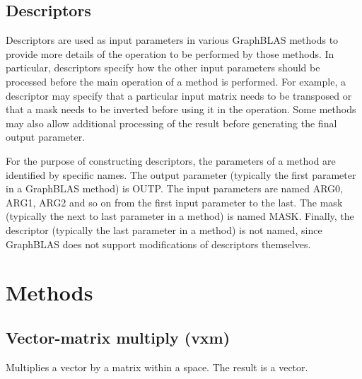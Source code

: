 \documentclass[11pt]{extarticle}
\begin{document}
\subsection{Descriptors}

Descriptors are used as input parameters in various GraphBLAS methods to
provide more details of the operation to be performed by those methods.
In particular, descriptors specify how the other input parameters
should be processed before the main operation of a method is performed.
For example, a descriptor may specify that a particular input matrix
needs to be transposed or that a mask needs to be inverted before using
it in the operation. Some methods may also allow additional processing
of the result before generating the final output parameter.


For the purpose of constructing descriptors, the parameters of a method
are identified by specific names. The output parameter (typically
the first parameter in a GraphBLAS method) is {\sf OUTP}.  The input
parameters are named {\sf ARG0}, {\sf ARG1}, {\sf ARG2} and so on from
the first input parameter to the last. The mask (typically the next to
last parameter in a method) is named {\sf MASK}. Finally, the descriptor
(typically the last parameter in a method) is not named, since GraphBLAS
does not support modifications of descriptors themselves.



\section{Methods}

\subsection{Vector-matrix multiply ({\sf vxm})}

Multiplies a vector by a matrix within a space. The result is a vector.
\end{document}
